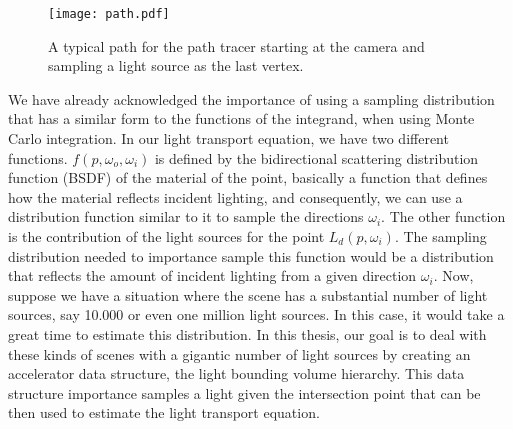 \begin{figure}
	\begin{center}
		\texttt{[image: path.pdf]}
		\caption{A typical path for the path tracer starting at the camera and sampling a light source as the last vertex.}
		\label{fig:path}
	\end{center}
\end{figure}

We have already acknowledged the importance of using a sampling distribution that has a similar form to the functions of the integrand, when using Monte Carlo integration. In our light transport equation, we have two different functions. $f(p, \omega_o, \omega_i)$ is defined by the bidirectional scattering distribution function (BSDF) of the material of the point, basically a function that defines how the material reflects incident lighting, and consequently, we can use a distribution function similar to it to sample the directions $\omega_i$. The other function is the contribution of the light sources for the point $L_d(p, \omega_i)$. The sampling distribution needed to importance sample this function would be a distribution that reflects the amount of incident lighting from a given direction $\omega_i$. Now, suppose we have a situation where the scene has a substantial number of light sources, say 10.000 or even one million light sources. In this case, it would take a great time to estimate this distribution. In this thesis, our goal is to deal with these kinds of scenes with a gigantic number of light sources by creating an accelerator data structure, the light bounding volume hierarchy. This data structure importance samples a light given the intersection point that can be then used to estimate the light transport equation.